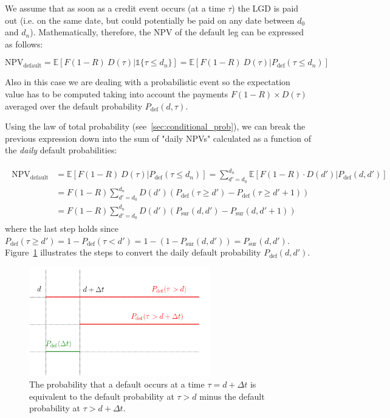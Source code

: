 We assume that as soon as a credit event occurs (at a time $\tau$) the LGD is paid out (i.e. on the same date, but could potentially be paid on any date between $d_0$ and $d_n$). Mathematically, therefore, the NPV of the default leg can be expressed as follows:

\begin{equation}
\mathrm{NPV_{default}} =\mathbb{E}[F(1-R)~D(\tau)|\mathbb{1} \{\tau \leq d_n\} ] = \mathbb{E}[F(1-R)~D(\tau)|P_{\textrm{def}}(\tau \leq d_n) ]
\end{equation}

Also in this case we are dealing with a probabilistic event so the expectation value has to be computed taking into account the payments $F(1-R)\times D(\tau)$ averaged over the default probability $P_{\textrm{def}}(d, \tau)$. 

Using the law of total probability (see~\ref{sec:conditional_prob}), we can break the previous expression down into the sum of "daily NPVs" calculated as a function of the \emph{daily} default probabilities:

\begin{align}
\begin{split}
\mathrm{NPV_{default}} &= \mathbb{E}[F(1-R)~D(\tau)|P_{\textrm{def}}(\tau \leq d_n) ] = \sum_{d'=d_0}^{d_n} \mathbb{E}[F(1-R) \cdot D(d')|P_{\textrm{def}}(d, d')] \\
&= F(1-R) \sum_{d'=d_0}^{d_n} D(d') \left(P_{\textrm{def}}(\tau \geq d') - P_{\textrm{def}}( \tau \geq d'+1) \right) \\
&= F(1-R) \sum_{d'=d_0}^{d_n} D(d') \left( P_{\textrm{sur}}(d, d') - P_{\textrm{sur}}(d, d'+1) \right)
\end{split}
\end{align}
where the last step holds since $P_{\textrm{def}}(\tau\geq d') = 1 - P_{\textrm{def}}(\tau < d') = 1 - (1-P_{\textrm{sur}}(d, d')) = P_{\textrm{sur}}(d, d')$. 
Figure~\ref{fig:default_p} illustrates the steps to convert the daily default probability $P_{\textrm{def}}(d, d')$.

\begin{figure}[htb]
\centering
\includegraphics[width=0.7\textwidth]{figures/timeline.png}
\caption{The probability that a default occurs at a time $\tau = d+\Delta t$ is equivalent to the default probability at $\tau > d$ minus the default probability at $\tau>d+\Delta t$.}
\label{fig:default_p}
\end{figure}

